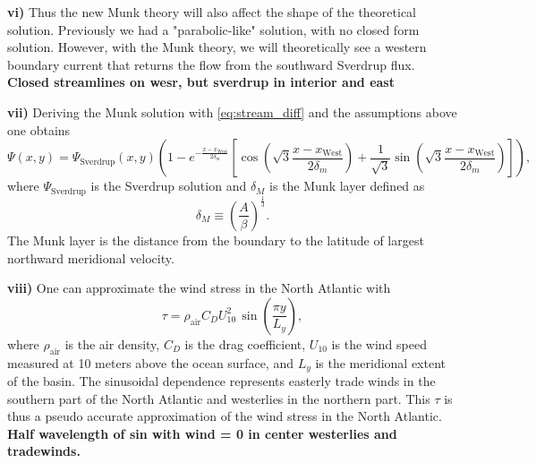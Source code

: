 \textbf{vi)} Thus the new Munk theory will also affect the shape of the theoretical solution. Previously we had a "parabolic-like" solution, with no closed form solution. However, with the Munk theory, we will theoretically see a western boundary current that returns the flow from the southward Sverdrup flux.   
\textbf{Closed streamlines on wesr, but sverdrup in interior and east}

\textbf{vii)} Deriving the Munk solution with \autoref{eq:stream_diff} and the assumptions above one obtains
\begin{equation}
    \Psi(x,y)=\Psi_\text{Sverdrup}(x,y)\left(1-e^{-\frac{x-x_\text{West}}{2\delta_m}}\left[\cos\left(\sqrt{3}\frac{x-x_\text{West}}{2\delta_m}\right)+\frac{1}{\sqrt{3}}\sin\left(\sqrt{3}\frac{x-x_\text{West}}{2\delta_m}\right)\right]\right),
\end{equation}
where $\Psi_\text{Sverdrup}$ is the Sverdrup solution and $\delta_M$ is the Munk layer defined as 
\begin{equation}
    \delta_M\equiv\left(\frac{A}{\beta}\right)^{\tfrac{1}{3}}.
\end{equation}
The Munk layer is the distance from the boundary to the latitude of largest northward meridional velocity. 

\textbf{viii)} One can approximate the wind stress in the North Atlantic with 
\begin{equation}
    \tau=\rho_\text{air}C_DU_{10}^2\,\sin\left(\frac{\pi y}{L_y}\right),
\end{equation}
where $\rho_\text{air}$ is the air density, $C_D$ is the drag coefficient, $U_{10}$ is the wind speed measured at 10 meters above the ocean surface, and $L_y$ is the meridional extent of the basin. The sinusoidal dependence represents easterly trade winds in the southern part of the North Atlantic and westerlies in the northern part. This $\tau$ is thus a pseudo accurate approximation of the wind stress in the North Atlantic.
\textbf{Half wavelength of sin with wind = 0 in center westerlies and tradewinds. }
